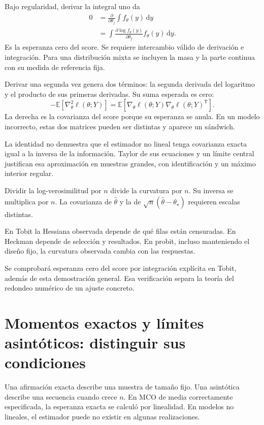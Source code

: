\documentclass[11pt,a4paper]{article}
\newcommand{\E}{\mathbb E}
\newcommand{\T}{^{\mathsf T}}
\newcommand{\dd}{\,\mathrm d}
\begin{document}
Bajo regularidad, derivar la integral uno da
\[
\begin{aligned}
0&=\frac{\partial}{\partial\theta_j}\int f_\theta(y)\dd y\\
&=\int
\frac{\partial\log f_\theta(y)}{\partial\theta_j}
f_\theta(y)\dd y.
\end{aligned}
\]
Es la esperanza cero del score.
Se requiere intercambio válido de derivación e integración.
Para una distribución mixta se incluyen la masa
y la parte continua con su medida de referencia fija.

Derivar una segunda vez genera dos términos:
la segunda derivada del logaritmo y el
producto de sus primeras derivadas.
Su suma esperada es cero:
\[
-\E[\nabla_\theta^2\ell(\theta;Y)]
=\E[\nabla_\theta\ell(\theta;Y)
\nabla_\theta\ell(\theta;Y)\T].
\]
La derecha es la covarianza del score
porque su esperanza se anula.
En un modelo incorrecto, estas dos matrices
pueden ser distintas y aparece un sándwich.

La identidad no demuestra que el estimador
no lineal tenga covarianza exacta igual
a la inversa de la información.
Taylor de sus ecuaciones y un límite central
justifican esa aproximación en muestras grandes,
con identificación y un máximo interior regular.

\begin{ejemplo}[Escala]
Dividir la log-verosimilitud por \(n\)
divide la curvatura por \(n\).
Su inversa se multiplica por \(n\).
La covarianza de \(\widehat\theta\)
y la de \(\sqrt n(\widehat\theta-\theta_\star)\)
requieren escalas distintas.
\end{ejemplo}
En Tobit la Hessiana observada depende de
qué filas están censuradas.
En Heckman depende de selección y resultados.
En probit, incluso manteniendo el diseño fijo,
la curvatura observada cambia con las respuestas.

Se comprobará esperanza cero del score
por integración explícita en Tobit,
además de esta demostración general.
Esa verificación separa la teoría del
redondeo numérico de un ajuste concreto.

\clearpage
\section{Momentos exactos y límites asintóticos: distinguir sus condiciones}\label{unidad15}
Una afirmación exacta describe una muestra de tamaño fijo.
Una asintótica describe una secuencia cuando crece \(n\).
En MCO de media correctamente especificada,
la esperanza exacta se calculó por linealidad.
En modelos no lineales, el estimador puede
no existir en algunas realizaciones.
\end{document}

